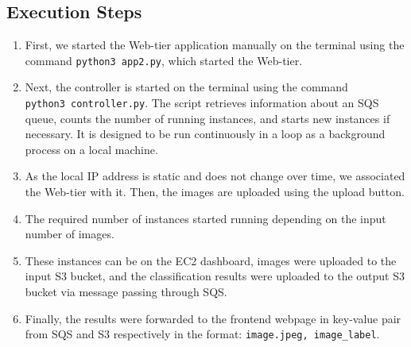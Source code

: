 \documentclass[../main.tex]{subfiles}
\begin{document}
\subsection*{Execution Steps}

\begin{enumerate}
\item First, we started the Web-tier application manually on the terminal using the command \texttt{python3 app2.py}, which started the Web-tier.
\item Next, the controller is started on the terminal using the command\\ \verb|python3 controller.py|. The script retrieves information about an SQS queue, counts the number of running instances, and starts new instances if necessary. It is designed to be run continuously in a loop as a background process on a local machine.
\item As the local IP address is static and does not change over time, we associated the Web-tier with it. Then, the images are uploaded using the upload button.
\item The required number of instances started running depending on the input number of images.
\item These instances can be on the EC2 dashboard, images were uploaded to the input S3 bucket, and the classification results were uploaded to the output S3 bucket via message passing through SQS.
\item Finally, the results were forwarded to the frontend webpage in key-value pair from SQS and S3 respectively in the format: \verb|image.jpeg, image_label|.
\end{enumerate}


\end{document}
